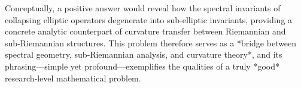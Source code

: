 Conceptually, a positive answer would reveal how the spectral invariants of collapsing elliptic operators degenerate into sub‑elliptic invariants, providing a concrete analytic counterpart of curvature transfer between Riemannian and sub‑Riemannian structures. This problem therefore serves as a *bridge between spectral geometry, sub‑Riemannian analysis, and curvature theory*, and its phrasing—simple yet profound—exemplifies the qualities of a truly *good* research‑level mathematical problem.